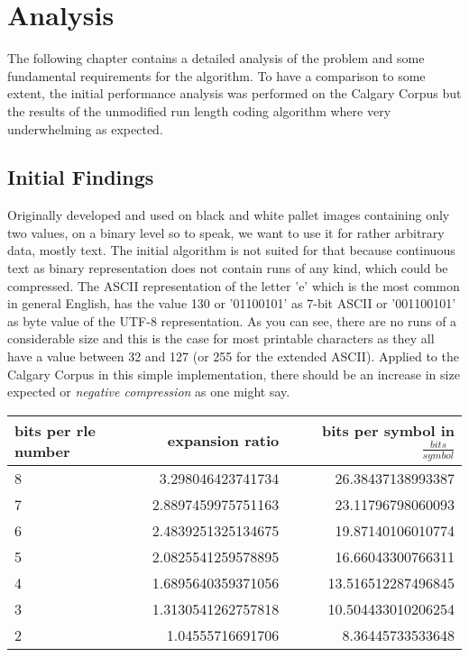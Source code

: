 
\chapter{Analysis}
\label{ch:Analysis}

\par{
The following chapter contains a detailed analysis of the problem and some fundamental requirements for the algorithm. To have a comparison to some extent, the initial performance analysis was performed on the Calgary Corpus but the results of the unmodified run length coding algorithm where very underwhelming as expected.
}

\section{Initial Findings}
\label{ch:Analysis:sec:Initial Findings}
\par{
 Originally developed and used on black and white pallet images containing only two values, on a binary level so to speak, we want to use it for rather arbitrary data, mostly text. The initial algorithm is not suited for that because continuous text as binary representation does not contain runs of any kind, which could be compressed. The ASCII representation of the letter 'e' which is the most common in general English, has the value 130 or '01100101' as 7-bit ASCII or '001100101' as byte value of the UTF-8 representation. As you can see, there are no runs of a considerable size and this is the case for most printable characters as they all have a value between 32 and 127 (or 255 for the extended ASCII). Applied to the Calgary Corpus in this simple implementation, there should be an increase in size expected or \textit{negative compression} as one might say.
}

\begin{center}
	\begin{tabular}[p]{l|r|r}
		\label{tab:t4 simple run length eval}
		
		bits per rle number &  expansion ratio & bits per symbol in $\frac{bits}{symbol}$\\
		\hline
		8 & 3.298046423741734& 26.38437138993387 \\
		7 & 2.8897459975751163& 23.11796798060093\\
		6 & 2.4839251325134675& 19.87140106010774 \\
		5 & 2.0825541259578895 & 16.66043300766311\\
		4 & 1.6895640359371056 & 13.516512287496845\\
		3 & 1.3130541262757818 & 10.504433010206254\\
		2 & 1.04555716691706 & 8.36445733533648 \\
	\end{tabular}
\end{center}

